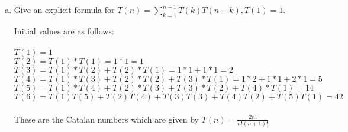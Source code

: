\documentclass[12pt]{article}
\begin{document}
\begin{enumerate}[(a)]
\item Give an explicit formula for $T(n) = \sum\limits_{k=1}^{n-1} T(k)T(n-k),  T(1) = 1.$
\begin{addmargin}[2em]{2em}
Initial values are as follows: \\ \\
$T(1) = 1$ \\
$T(2) = T(1) * T(1) = 1 * 1 = 1$ \\
$T(3) = T(1) * T(2) + T(2) * T(1) = 1 * 1 + 1 * 1 = 2$ \\
$T(4) = T(1) * T(3) + T(2) * T(2) + T(3) * T(1) = 1 * 2 + 1 * 1 + 2 * 1 = 5$ \\
$T(5) = T(1) * T(4) + T(2) * T(3) + T(3) * T(2) + T(4) * T(1) = 14$ \\
$T(6) = T(1)T(5) + T(2)T(4) + T(3)T(3) + T(4)T(2) + T(5)T(1) = 42$ \\ \\
These are the Catalan numbers which are given by $T(n) = \frac{2n!}{n!(n+1)!}$
\end{addmargin}
\end{enumerate}
\end{document}
